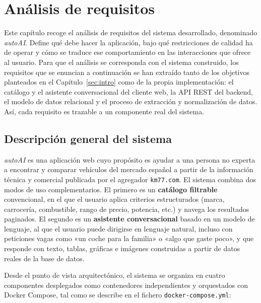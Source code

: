 \chapter{Análisis de requisitos}
\label{cap:requisitos}

Este capítulo recoge el análisis de requisitos del sistema desarrollado,
denominado \emph{autoAI}. Define qué debe hacer la aplicación, bajo qué
restricciones de calidad ha de operar y cómo se traduce ese comportamiento en
las interacciones que ofrece al usuario. Para que el análisis se corresponda
con el sistema construido, los requisitos que se enuncian a continuación se han
extraído tanto de los objetivos planteados en el Capítulo~\ref{sec:intro} como
de la propia implementación: el catálogo y el asistente conversacional del
cliente web, la API REST del backend, el modelo de datos relacional y el proceso
de extracción y normalización de datos. Así, cada requisito es trazable a un
componente real del sistema.

\section{Descripción general del sistema}
\label{sec:req-descripcion}

\emph{autoAI} es una aplicación web cuyo propósito es ayudar a una persona no
experta a encontrar y comparar vehículos del mercado español a partir de la
información técnica y comercial publicada por el agregador \texttt{km77.com}. El
sistema combina dos modos de uso complementarios. El primero es un
\textbf{catálogo filtrable} convencional, en el que el usuario aplica criterios
estructurados (marca, carrocería, combustible, rango de precio, potencia, etc.)
y navega los resultados paginados. El segundo es un \textbf{asistente
conversacional} basado en un modelo de lenguaje, al que el usuario puede
dirigirse en lenguaje natural, incluso con peticiones vagas como «un coche para
la familia» o «algo que gaste poco», y que responde con texto, tablas, gráficas
e imágenes construidas a partir de datos reales de la base de datos.

Desde el punto de vista arquitectónico, el sistema se organiza en cuatro
componentes desplegados como contenedores independientes y orquestados con
Docker Compose, tal como se describe en el fichero \texttt{docker-compose.yml}:

